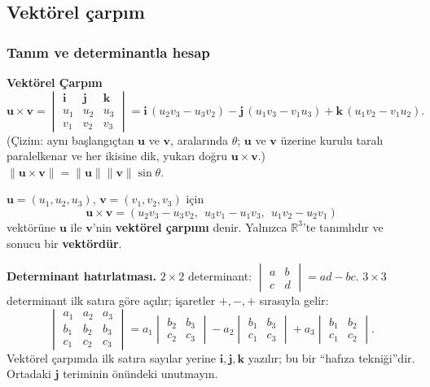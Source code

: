 \subsection{Vektörel çarpım}

\subsubsection{Tanım ve determinantla hesap}

\begin{tahta}
\textbf{Vektörel Çarpım}
\[
\mathbf u\times\mathbf v=\begin{vmatrix}\mathbf i&\mathbf j&\mathbf k\\u_1&u_2&u_3\\v_1&v_2&v_3\end{vmatrix}
=\mathbf i\,(u_2v_3-u_3v_2)-\mathbf j\,(u_1v_3-v_1u_3)+\mathbf k\,(u_1v_2-v_1u_2).
\]
(Çizim: aynı başlangıçtan $\mathbf u$ ve $\mathbf v$, aralarında $\theta$; $\mathbf u$ ve $\mathbf v$ üzerine kurulu taralı paralelkenar ve her ikisine dik, yukarı doğru $\mathbf u\times\mathbf v$.) \quad $\|\mathbf u\times\mathbf v\|=\|\mathbf u\|\|\mathbf v\|\sin\theta$.
\end{tahta}

\begin{tanim}
$\mathbf u=(u_1,u_2,u_3)$, $\mathbf v=(v_1,v_2,v_3)$ için
\[
\mathbf u\times\mathbf v=(u_2v_3-u_3v_2,\ \ u_3v_1-u_1v_3,\ \ u_1v_2-u_2v_1)
\]
vektörüne $\mathbf u$ ile $\mathbf v$'nin \textbf{vektörel çarpımı} denir. Yalnızca $\mathbb R^3$'te tanımlıdır ve sonucu bir \textbf{vektördür}.
\end{tanim}

\textbf{Determinant hatırlatması.} $2\times2$ determinant: $\begin{vmatrix}a&b\\c&d\end{vmatrix}=ad-bc$. $3\times3$ determinant ilk satıra göre açılır; işaretler $+,-,+$ sırasıyla gelir:
\[
\begin{vmatrix}a_1&a_2&a_3\\b_1&b_2&b_3\\c_1&c_2&c_3\end{vmatrix}
=a_1\begin{vmatrix}b_2&b_3\\c_2&c_3\end{vmatrix}
-a_2\begin{vmatrix}b_1&b_3\\c_1&c_3\end{vmatrix}
+a_3\begin{vmatrix}b_1&b_2\\c_1&c_2\end{vmatrix}.
\]
Vektörel çarpımda ilk satıra sayılar yerine $\mathbf i,\mathbf j,\mathbf k$ yazılır; bu bir ``hafıza tekniği''dir. Ortadaki $\mathbf j$ teriminin önündeki  unutmayın.


